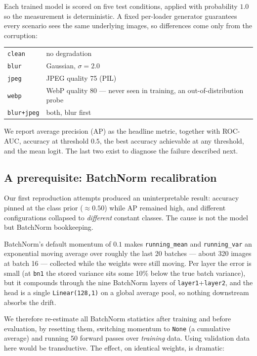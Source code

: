 Each trained model is scored on five test conditions, applied with probability
$1.0$ so the measurement is deterministic. A fixed per-loader generator
guarantees every scenario sees the same underlying images, so differences come
only from the corruption:

\begin{center}
\begin{tabular}{ll}
  \toprule
  \texttt{clean}     & no degradation \\
  \texttt{blur}      & Gaussian, $\sigma = 2.0$ \\
  \texttt{jpeg}      & JPEG quality 75 (PIL) \\
  \texttt{webp}      & WebP quality 80 --- never seen in training, an out-of-distribution probe \\
  \texttt{blur+jpeg} & both, blur first \\
  \bottomrule
\end{tabular}
\end{center}

We report average precision (AP) as the headline metric, together with ROC-AUC,
accuracy at threshold $0.5$, the best accuracy achievable at any threshold, and
the mean logit. The last two exist to diagnose the failure described next.

\subsection{A prerequisite: BatchNorm recalibration}
\label{sec:setup-bn}

Our first reproduction attempts produced an uninterpretable result: accuracy
pinned at the class prior ($\approx0.50$) while AP remained high, and different
configurations collapsed to \emph{different} constant classes. The cause is not
the model but BatchNorm bookkeeping.

BatchNorm's default momentum of $0.1$ makes \texttt{running\_mean} and
\texttt{running\_var} an exponential moving average over roughly the last 20
batches --- about 320 images at batch 16 --- collected while the weights were
still moving. Per layer the error is small (at \texttt{bn1} the stored variance
sits some 10\% below the true batch variance), but it compounds through the nine
BatchNorm layers of \texttt{layer1}+\texttt{layer2}, and the head is a single
\texttt{Linear(128,1)} on a global average pool, so nothing downstream absorbs
the drift.

We therefore re-estimate all BatchNorm statistics after training and before
evaluation, by resetting them, switching momentum to \texttt{None} (a cumulative
average) and running 50 forward passes over \emph{training} data. Using
validation data here would be transductive. The effect, on identical weights, is
dramatic:

